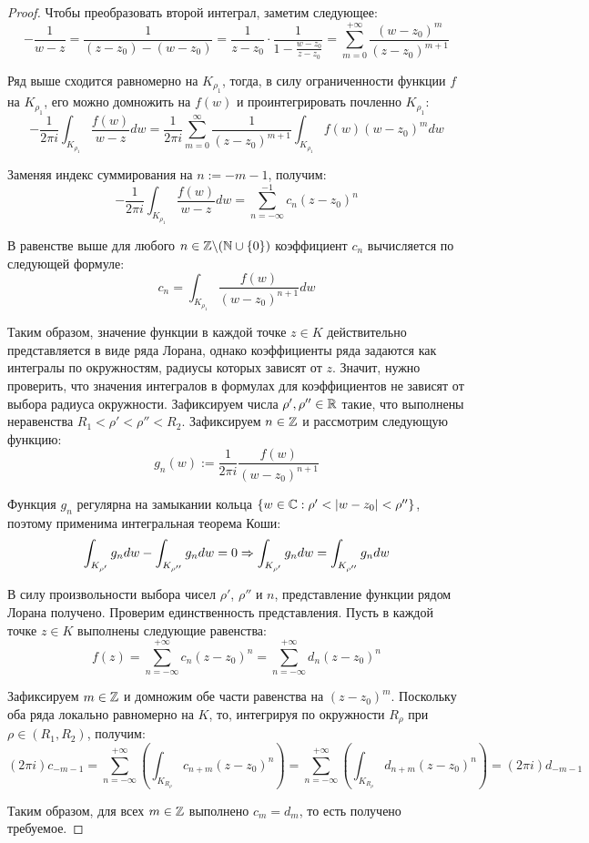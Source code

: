 \begin{proof}
	Чтобы преобразовать второй интеграл, заметим следующее:
	\[-\frac1{w - z} = \frac1{(z-z_0) - (w - z_0)} = \frac1{z-z_0}\cdot \frac1{1 - \frac{w-z_0}{z - z_0}} = \sum_{m=0}^{+\infty}\frac{(w-z_0)^m}{(z-z_0)^{m + 1}}\]
		
	Ряд выше сходится равномерно на $K_{\rho_1}$, тогда, в силу ограниченности функции $f$ на $K_{\rho_1}$, его можно домножить на $f(w)$ и проинтегрировать почленно $K_{\rho_1}$:
	\[- \frac1{2\pi i} \int_{K_{\rho_1}}\frac{f(w)}{w - z}dw = \frac1{2\pi i}\sum_{m=0}^\infty\frac1{(z-z_0)^{m + 1}}\int_{K_{\rho_1}}f(w)(w-z_0)^mdw\]
	
	Заменяя индекс суммирования на $n := -m - 1$, получим:
	\[-\frac1{2\pi i} \int_{K_{\rho_1}}\frac{f(w)}{w - z}dw = \sum_{n = -\infty}^{-1}c_n(z - z_0)^n\]
	
	В равенстве выше для любого $n \in \mathbb{Z} \backslash (\mathbb{N} \cup \{0\})$ коэффициент $c_n$ вычисляется по следующей формуле:
	\[c_n = \int_{K_{\rho_1}}\frac{f(w)}{(w - z_0)^{n+1}}dw\]
	
	Таким образом, значение функции в каждой точке $z \in K$ действительно представляется в виде ряда Лорана, однако коэффициенты ряда задаются как интегралы по окружностям, радиусы которых зависят от $z$. Значит, нужно проверить, что значения интегралов в формулах для коэффициентов не зависят от выбора радиуса окружности. Зафиксируем числа $\rho', \rho'' \in \mathbb{R}$ такие, что выполнены неравенства $R_1 < \rho' < \rho'' < R_2$. Зафиксируем $n \in \mathbb{Z}$ и рассмотрим следующую функцию:
	\[g_n(w) := \frac1{2\pi i} \frac{f(w)}{(w - z_0)^{n+1}}\]
	
	Функция $g_n$ регулярна на замыкании кольца $\{w \in \mathbb{C}: \rho' < |w - z_0| < \rho''\}$, поэтому применима интегральная теорема Коши:
	\[\int_{K_{\rho'}}g_ndw - \int_{K_{\rho''}}g_ndw = 0 \Rightarrow \int_{K_{\rho'}}g_ndw = \int_{K_{\rho''}}g_ndw\]
	
	В силу произвольности выбора чисел $\rho'$, $\rho''$ и $n$, представление функции рядом Лорана получено. Проверим единственность представления. Пусть в каждой точке $z \in K$ выполнены следующие равенства:
	\[f(z) = \sum_{n = -\infty}^{+\infty}c_n(z - z_0)^n = \sum_{n = -\infty}^{+\infty}d_n(z - z_0)^n\]
	
	Зафиксируем $m \in \mathbb{Z}$ и домножим обе части равенства на $(z - z_0)^m$. Поскольку оба ряда локально равномерно на $K$, то, интегрируя по окружности $R_{\rho}$ при $\rho \in (R_1, R_2)$, получим:
	\[{(2\pi i)}{c_{-m - 1}} = \sum_{n = -\infty}^{+\infty}\left(\int_{K_{R_\rho}}c_{n + m}(z - z_0)^n\right) = \sum_{n = -\infty}^{+\infty}\left(\int_{K_{R_\rho}}d_{n + m}(z - z_0)^n\right) = {(2\pi i)}{d_{-m - 1}}\]
	
	Таким образом, для всех $m \in \mathbb{Z}$ выполнено $c_m = d_m$, то есть получено требуемое.
\end{proof}

